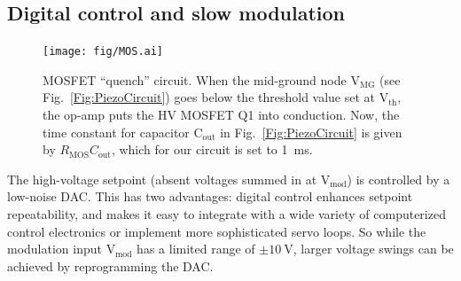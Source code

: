 \documentclass[aip,rsi,reprint]{revtex4-1} %
\begin{document}
%
%

\subsection{Digital control and slow modulation}
\label{Sec:SlowModulationMOS}

\begin{figure}[b!]
\texttt{[image: fig/MOS.ai]}
\caption{MOSFET ``quench'' circuit.
When the mid-ground node $\text{V}_\text{MG}$ (see Fig.~\ref{Fig:PiezoCircuit}) goes below the threshold value set at $\text{V}_\text{th}$, the op-amp puts the HV MOSFET Q1 into conduction.
Now, the time constant for capacitor $\text{C}_\text{out}$ in Fig.~\ref{Fig:PiezoCircuit} is given by $R_\text{MOS} C_\text{out}$, which for our circuit is set to \SI{1}{\milli\second}.
\label{Fig:MOS}}
\end{figure}

The high-voltage setpoint (absent voltages summed in at $\text{V}_\text{mod}$) is controlled by a low-noise DAC.
This has two advantages: digital control enhances setpoint repeatability, and makes it easy to integrate with a wide variety of computerized control electronics or implement more sophisticated servo loops.
So while the modulation input $\text{V}_\text{mod}$ has a limited range of $\pm\SI{10}{\volt}$, larger voltage swings can be achieved by reprogramming the DAC.
\end{document}
